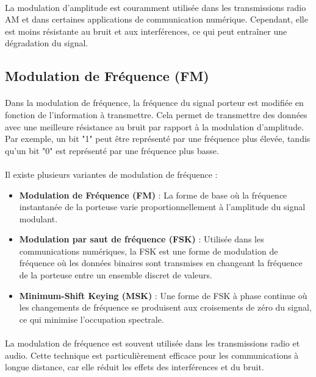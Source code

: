 \documentclass[a4paper,twocolumn]{report}
\begin{document}
\paragraph{}La modulation d'amplitude est couramment utilisée dans les transmissions
radio AM et dans certaines applications de communication numérique. Cependant,
elle est moins résistante au bruit et aux interférences, ce qui peut entraîner une dégradation du signal.

\subsection{Modulation de Fréquence (FM)}
\paragraph{}Dans la modulation de fréquence, la fréquence du signal porteur est
modifiée en fonction de l'information à transmettre. Cela permet de transmettre
des données avec une meilleure résistance au bruit par rapport à la modulation d'amplitude.
Par exemple, un bit "1" peut être représenté par une fréquence plus élevée,
tandis qu'un bit "0" est représenté par une fréquence plus basse.
\paragraph{}Il existe plusieurs variantes de modulation de fréquence :
\begin{itemize}
	\item \textbf{Modulation de Fréquence (FM)} :
    La forme de base où la fréquence instantanée de la porteuse varie proportionnellement
    à l'amplitude du signal modulant.
	\item \textbf{Modulation par saut de fréquence (FSK)} :
    Utilisée dans les communications numériques, la FSK est une forme de modulation
    de fréquence où les données binaires sont transmises en changeant
    la fréquence de la porteuse entre un ensemble discret de valeurs.
	\item \textbf{Minimum-Shift Keying (MSK)} :
    Une forme de FSK à phase continue où les changements de fréquence se produisent
    aux croisements de zéro du signal, ce qui minimise l'occupation spectrale.
\end{itemize}
\paragraph{}La modulation de fréquence est souvent utilisée dans les transmissions
radio et audio. Cette technique est particulièrement efficace pour les communications à longue distance,
car elle réduit les effets des interférences et du bruit.
\end{document}
